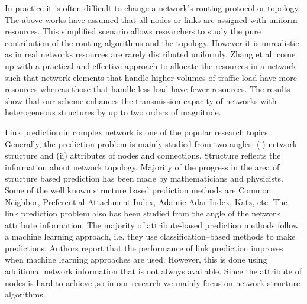 \documentclass[onecolumn,preprintnumbers,amsmath,amssymb]{revtex4}
\begin{document}
In practice it is often difficult to change a network’s routing protocol or topology. The above works have assumed that all nodes or links are assigned with uniform
resources. This simplified scenario allows researchers to study the pure contribution of the routing algorithms and the topology. However it is unrealistic as in real networks resources are rarely distributed uniformly.
Zhang et al. come up with a practical and effective approach to allocate the resources in a network such that network elements that handle higher volumes of traffic load have more resources whereas those that handle less load have fewer resources. The results show that our scheme enhances the transmission capacity of networks with heterogeneous structures by up to two orders of magnitude\cite{GQZ}.

Link prediction in complex network is one of the popular research topics. Generally, the prediction problem is mainly studied from two angles: (i) network structure and (ii) attributes of nodes and connections. Structure reflects the information about network topology. Majority of the progress in the area of structure based prediction has been made by mathematicians and physicists. Some of the well known structure based prediction methods are Common Neighbor, Preferential Attachment Index, Adamic-Adar Index, Katz, etc. The link prediction problem also has been studied from the angle of the network attribute information. The majority of attribute-based prediction methods follow a machine learning approach, i.e. they use classification–based methods to make predictions. Authors \cite{LPU,NPA,LPC,WWC,SRM} report that the performance of link prediction improves when machine learning approaches are used. However, this is done using additional network information that is not always available. Since the attribute of nodes is hard to achieve ,so in our research we mainly focus on network structure algorithms.





\end{document}
